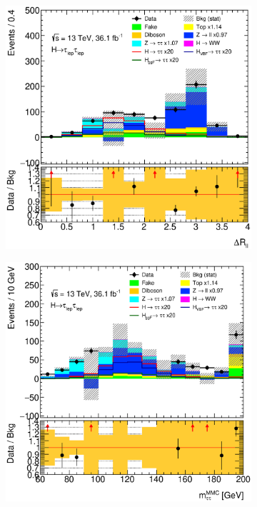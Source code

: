 \begin{figure}[htb]
    \centering
    \begin{subfigure}[t]{0.3\textwidth}
        \includegraphics[width=\textwidth]{./plots/mva/modeling/input_vars/VBF_SF/ll-CutMVAVBFCatSF-DeltaRLL-lin.eps}
    \end{subfigure}
    \begin{subfigure}[t]{0.3\textwidth}
        \includegraphics[width=\textwidth]{./plots/mva/modeling/input_vars/VBF_SF/ll-CutMVAVBFCatSF-dilep_mmc_mlm_m-lin.eps}

\end{subfigure}
\end{figure}
